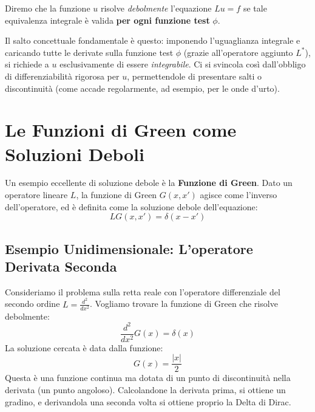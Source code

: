 Diremo che la funzione $u$ risolve \textit{debolmente} l'equazione $L u = f$ se tale equivalenza integrale è valida \textbf{per ogni funzione test} $\phi$.

Il salto concettuale fondamentale è questo: imponendo l'uguaglianza integrale e caricando tutte le derivate sulla funzione test $\phi$ (grazie all'operatore aggiunto $L^*$), si richiede a $u$ esclusivamente di essere \textit{integrabile}. Ci si svincola così dall'obbligo di differenziabilità rigorosa per $u$, permettendole di presentare salti o discontinuità (come accade regolarmente, ad esempio, per le onde d'urto).

\section{Le Funzioni di Green come Soluzioni Deboli}

Un esempio eccellente di soluzione debole è la \textbf{Funzione di Green}. Dato un operatore lineare $L$, la funzione di Green $G(x, x')$ agisce come l'inverso dell'operatore, ed è definita come la soluzione debole dell'equazione:
\begin{equation}
L G(x, x') = \delta(x - x')
\end{equation}

\subsection{Esempio Unidimensionale: L'operatore Derivata Seconda}
Consideriamo il problema sulla retta reale con l'operatore differenziale del secondo ordine $L = \frac{d^2}{dx^2}$. Vogliamo trovare la funzione di Green che risolve debolmente:
\begin{equation}
\frac{d^2}{dx^2} G(x) = \delta(x)
\end{equation}
La soluzione cercata è data dalla funzione:
\begin{equation}
G(x) = \frac{|x|}{2}
\end{equation}
Questa è una funzione continua ma dotata di un punto di discontinuità nella derivata (un punto angoloso). Calcolandone la derivata prima, si ottiene un gradino, e derivandola una seconda volta si ottiene proprio la Delta di Dirac.

